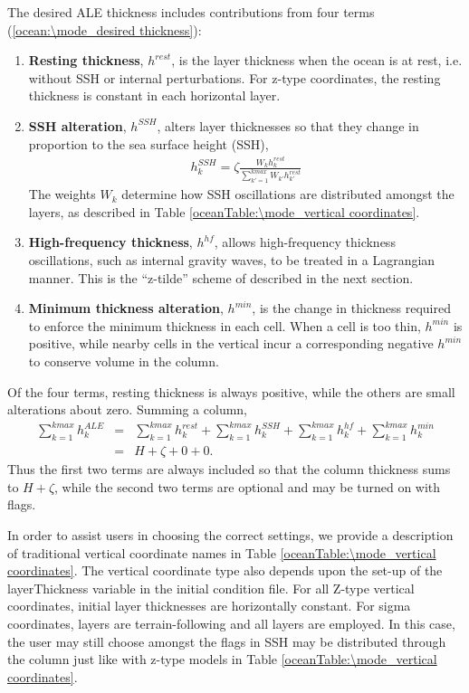 The desired ALE thickness includes contributions from four terms (\ref{ocean:\mode_desired thickness}):
\begin{enumerate}
\item {\bf Resting thickness}, $h^{rest}$, is the layer thickness when the ocean is at rest, i.e. without SSH or internal perturbations.  For z-type coordinates, the resting thickness is constant in each horizontal layer.
\item {\bf SSH alteration}, $h^{SSH}$, alters layer thicknesses so that they change in proportion to the sea surface height (SSH),
\begin{eqnarray}
\label{ocean:\mode_h ssh}
   h_k^{SSH} =  \zeta \frac{W_k h^{rest}_k}{\sum_{k'=1}^{kmax}W_{k'}h^{rest}_{k'}}
\end{eqnarray}
The weights $W_k$ determine how SSH oscillations are distributed amongst the layers, as described in Table \ref{oceanTable:\mode_vertical coordinates}.
\item {\bf High-frequency thickness}, $h^{hf}$, allows high-frequency thickness oscillations, such as internal gravity waves, to be treated in a Lagrangian manner.  This is the ``z-tilde'' scheme of \citet{Leclair_Madec11om} described in the next section.
\item {\bf Minimum thickness alteration}, $h^{min}$, is the change in thickness required to enforce the minimum thickness in each cell.  When a cell is too thin, $h^{min}$ is positive, while nearby cells in the vertical incur a corresponding negative $h^{min}$ to conserve volume in the column.
\end{enumerate}
Of the four terms, resting thickness is always positive, while the others are small alterations about zero.  Summing a column,
\begin{eqnarray}
\sum_{k=1}^{kmax} h_k^{ALE} &=& \sum_{k=1}^{kmax} h_k^{rest} + \sum_{k=1}^{kmax}h_k^{SSH} + \sum_{k=1}^{kmax}h_k^{hf} + \sum_{k=1}^{kmax}h_k^{min} 
\nonumber \\
&=& H + \zeta + 0 + 0.
\nonumber
\end{eqnarray}
Thus the first two terms are always included so that the column thickness sums to $H+\zeta$, while the second two terms are optional and may be turned on with flags.

In order to assist users in choosing the correct settings, we provide a description of traditional vertical coordinate names in Table \ref{oceanTable:\mode_vertical coordinates}.
The vertical coordinate type also depends upon the set-up of the layerThickness variable in the initial condition file.  For all Z-type vertical coordinates, initial layer thicknesses are horizontally constant.  For sigma coordinates, layers are terrain-following and all layers are employed.  In this case, the user may still choose amongst the flags in SSH may be distributed through the column just like with z-type models in Table \ref{oceanTable:\mode_vertical coordinates}.


